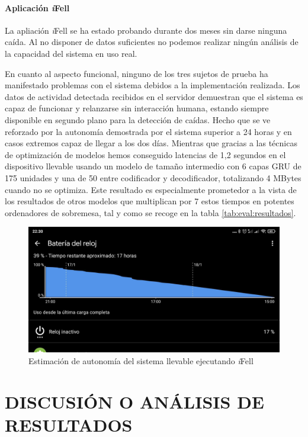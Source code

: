 \documentclass[11pt,a4paper,spanish,twocolumn]{article}
\def\ifell/{\textsl{\textsf{i}}\textsf{Fell}}
\begin{document}
\paragraph{Aplicación \ifell/}

La apliación \ifell/ se ha estado probando durante dos meses sin darse ninguna caída. Al no disponer de datos suficientes no podemos realizar ningún análisis de la capacidad del sistema en uso real. 

En cuanto al aspecto funcional, ninguno de los tres sujetos de prueba ha manifestado problemas con el sistema debidos a la implementación realizada. Los datos de actividad detectada recibidos en el servidor demuestran que el sistema es capaz de funcionar y relanzarse sin interacción humana, estando siempre disponible en segundo plano para la detección de caídas. Hecho que se ve reforzado por la autonomía demostrada por el sistema superior a 24 horas y en casos extremos capaz de llegar a los dos días. Mientras que gracias a las técnicas de optimización de modelos hemos conseguido latencias de 1,2 segundos en el dispositivo llevable usando un modelo de tamaño intermedio con 6 capas GRU de 175 unidades y una de 50 entre codificador y decodificador, totalizando 4 MBytes cuando no se optimiza. Este resultado es especialmente prometedor a la vista de los resultados de otros modelos que multiplican por 7 estos tiempos en potentes ordenadores de sobremesa, tal y como se recoge en la tabla \ref{tab:eval:resultados}. 
\begin{figure}
  \centering
  \includegraphics[width=0.95\columnwidth]{img/appBatt.png}
  \caption{\label{fig:ifell:bat} Estimación de autonomía del sistema llevable ejecutando \ifell/}
\end{figure}

\section{DISCUSIÓN O ANÁLISIS DE RESULTADOS}
\end{document}

